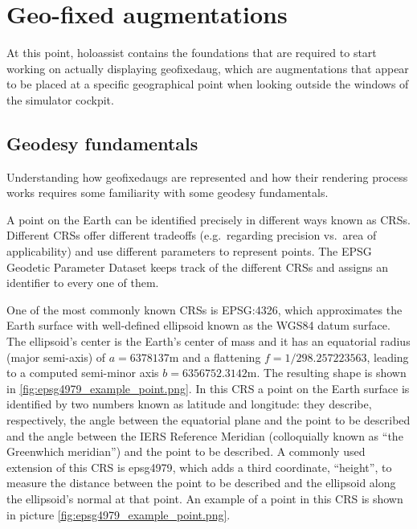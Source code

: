 \section{Geo-fixed augmentations}\label{section:geofixedaugmentations}

At this point, \gls{holoassist} contains the foundations that are required to start working on actually displaying \gls{geofixedaug}, which are augmentations that appear to be placed at a specific geographical point when looking outside the windows of the simulator cockpit.

\subsection{Geodesy fundamentals}\label{section:geodesyfundamentals}
Understanding how \glspl{geofixedaug} are represented and how their rendering process works requires some familiarity with some geodesy fundamentals.

A point on the Earth can be identified precisely in different ways known as \glspl{CRS}. Different \glspl{CRS} offer different tradeoffs (e.g.\ regarding precision vs.\ area of applicability) and use different parameters to represent points. The EPSG Geodetic Parameter Dataset\cite{iogp_geomatics_committee_epsg_nodate} keeps track of the different \glspl{CRS} and assigns an identifier to every one of them.

One of the most commonly known \glspl{CRS} is EPSG:4326, which approximates the Earth surface with well-defined ellipsoid known as the WGS84 datum surface\cite{noauthor_epsg4326_nodate}. The ellipsoid's center is the Earth's center of mass and it has an equatorial radius (major semi-axis) of $a = 6378137$m and a flattening $f = 1 / 298.257223563$, leading to a computed semi-minor axis $b = 6356752.3142$m\cite{zintl_design_2020}. The resulting shape is shown in \autoref{fig:epsg4979_example_point.png}. In this \gls{CRS} a point on the Earth surface is identified by two numbers known as latitude and longitude: they describe, respectively, the angle between the equatorial plane and the point to be described and the angle between the IERS Reference Meridian (colloquially known as \enquote{the Greenwhich meridian}) and the point to be described. A commonly used extension of this \gls{CRS} is \gls{epsg4979}, which adds a third coordinate, \enquote{height}, to measure the distance between the point to be described and the ellipsoid along the ellipsoid's normal at that point. An example of a point in this \gls{CRS} is shown in picture \autoref{fig:epsg4979_example_point.png}.

